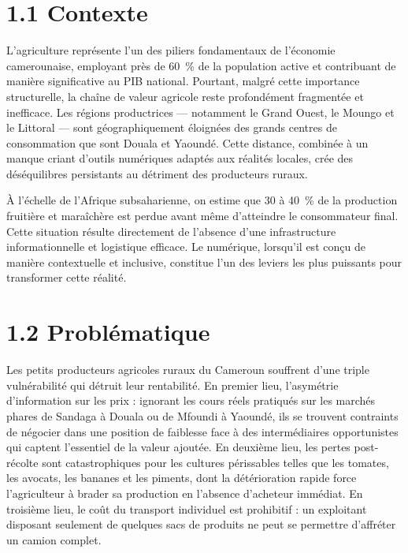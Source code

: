 \documentclass[12pt,a4paper]{report}
\begin{document}
\section*{1.1 Contexte}

L'agriculture représente l'un des piliers fondamentaux de l'économie camerounaise, employant près de 60~\% de la population active et contribuant de manière significative au PIB national. Pourtant, malgré cette importance structurelle, la chaîne de valeur agricole reste profondément fragmentée et inefficace. Les régions productrices — notamment le Grand Ouest, le Moungo et le Littoral — sont géographiquement éloignées des grands centres de consommation que sont Douala et Yaoundé. Cette distance, combinée à un manque criant d'outils numériques adaptés aux réalités locales, crée des déséquilibres persistants au détriment des producteurs ruraux.

À l'échelle de l'Afrique subsaharienne, on estime que 30 à 40~\% de la production fruitière et maraîchère est perdue avant même d'atteindre le consommateur final. Cette situation résulte directement de l'absence d'une infrastructure informationnelle et logistique efficace. Le numérique, lorsqu'il est conçu de manière contextuelle et inclusive, constitue l'un des leviers les plus puissants pour transformer cette réalité.

\section*{1.2 Problématique}

Les petits producteurs agricoles ruraux du Cameroun souffrent d'une triple vulnérabilité qui détruit leur rentabilité. En premier lieu, l'asymétrie d'information sur les prix : ignorant les cours réels pratiqués sur les marchés phares de Sandaga à Douala ou de Mfoundi à Yaoundé, ils se trouvent contraints de négocier dans une position de faiblesse face à des intermédiaires opportunistes qui captent l'essentiel de la valeur ajoutée. En deuxième lieu, les pertes post-récolte sont catastrophiques pour les cultures périssables telles que les tomates, les avocats, les bananes et les piments, dont la détérioration rapide force l'agriculteur à brader sa production en l'absence d'acheteur immédiat. En troisième lieu, le coût du transport individuel est prohibitif : un exploitant disposant seulement de quelques sacs de produits ne peut se permettre d'affréter un camion complet.
\end{document}
